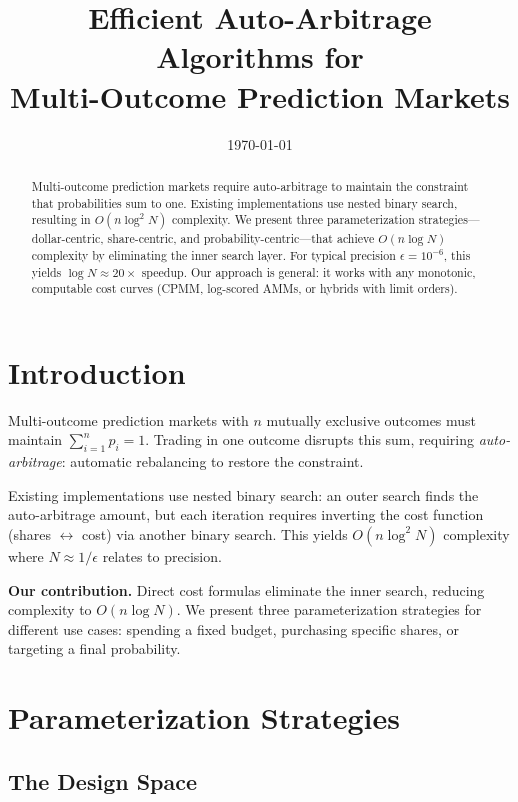 \documentclass[11pt]{article}
\title{Efficient Auto-Arbitrage Algorithms for\\Multi-Outcome Prediction Markets}
\author{}
\date{\today}
\begin{document}
\maketitle

\begin{abstract}
Multi-outcome prediction markets require auto-arbitrage to maintain the constraint that probabilities sum to one. Existing implementations use nested binary search, resulting in $O(n \log^2 N)$ complexity. We present three parameterization strategies---dollar-centric, share-centric, and probability-centric---that achieve $O(n \log N)$ complexity by eliminating the inner search layer. For typical precision $\epsilon = 10^{-6}$, this yields $\log N \approx 20\times$ speedup. Our approach is general: it works with any monotonic, computable cost curves (CPMM, log-scored AMMs, or hybrids with limit orders).
\end{abstract}

\section{Introduction}

Multi-outcome prediction markets with $n$ mutually exclusive outcomes must maintain $\sum_{i=1}^n p_i = 1$. Trading in one outcome disrupts this sum, requiring \emph{auto-arbitrage}: automatic rebalancing to restore the constraint.

Existing implementations use nested binary search: an outer search finds the auto-arbitrage amount, but each iteration requires inverting the cost function (shares $\leftrightarrow$ cost) via another binary search. This yields $O(n \log^2 N)$ complexity where $N \approx 1/\epsilon$ relates to precision.

\textbf{Our contribution.} Direct cost formulas eliminate the inner search, reducing complexity to $O(n \log N)$. We present three parameterization strategies for different use cases: spending a fixed budget, purchasing specific shares, or targeting a final probability.

\section{Parameterization Strategies}

\subsection{The Design Space}
\end{document}
